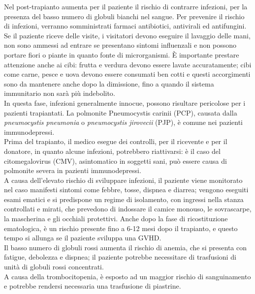 Nel post-trapianto aumenta per il paziente il rischio di contrarre infezioni, per la presenza del basso numero 
di globuli bianchi nel sangue. Per prevenire il rischio di infezioni, verranno somministrati farmaci antibiotici, 
antivirali ed antifungini\cite{LLSBLOOD}.\\ Se il paziente riceve delle visite, i visitatori devono eseguire il lavaggio delle mani, 
non sono ammessi ad entrare se presentano sintomi influenzali e non possono portare fiori o piante in quanto 
fonte di microrganismi. È importante prestare attenzione anche ai cibi: frutta e verdura devono essere 
lavate accuratamente; cibi come carne, pesce e uova devono essere consumati ben cotti e questi accorgimenti 
sono da mantenere anche dopo la dimissione, fino a quando il sistema immunitario non sarà più indebolito\cite{LLSBLOOD}.\\
In questa fase, infezioni generalmente innocue, possono risultare pericolose per i pazienti trapiantati. 
La polmonite Pneumocystis carinii (PCP), causata dalla \emph{pneumocystis pneumonia} o \emph{pneumocystis jirovecii} (PJP), 
è comune nei pazienti immunodepressi.\\
Prima del trapianto, il medico esegue dei controlli, per il ricevente e per il donatore, in quanto alcune 
infezioni, potrebbero riattivarsi: è il caso del citomegalovirus (CMV), asintomatico in soggetti sani, 
può essere causa di polmonite severa in pazienti immunodepressi\cite{STEMCELLS}.\\
A causa dell’elevato rischio di sviluppare infezioni, il paziente viene monitorato nel caso manifesti sintomi come 
febbre, tosse, dispnea e diarrea; vengono eseguiti esami ematici e si predispone un regime di isolamento, con 
ingressi nella stanza controllati e mirati, che prevedono di indossare il camice monouso, le sovrascarpe, 
la mascherina e gli occhiali protettivi.
Anche dopo la fase di ricostituzione ematologica, è un rischio presente fino a 6-12 mesi dopo il trapianto, e questo 
tempo si allunga se il paziente sviluppa una GVHD\cite{STEMCELLS}.\\

Il basso numero di globuli rossi aumenta il rischio di anemia, che si presenta con fatigue, debolezza e dispnea; 
il paziente potrebbe necessitare di trasfusioni di unità di globuli rossi concentrati\cite{LLSBLOOD}.\\
A causa della trombocitopenia, è esposto ad un maggior rischio di sanguinamento e potrebbe 
rendersi necessaria una trasfusione di piastrine\cite{LLSBLOOD}.\\

